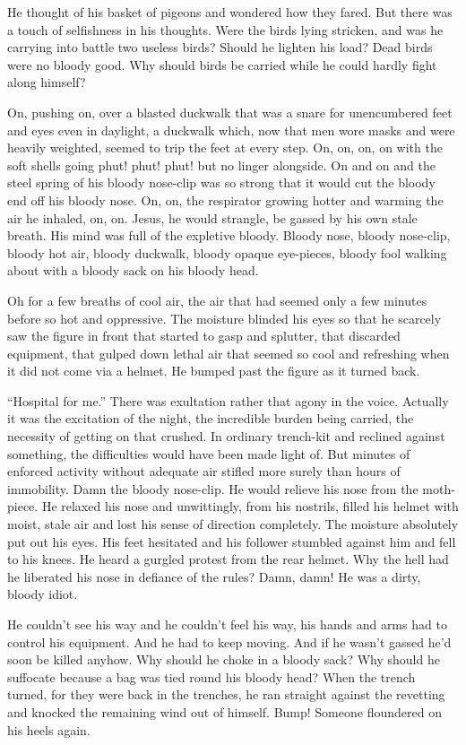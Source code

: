 He thought of his basket of pigeons and wondered how they fared. But there was a touch of selfishness in his thoughts. Were the birds lying stricken, and was he carrying into battle two useless birds? Should he lighten his load? Dead birds were no bloody good. Why should birds be carried while he could hardly fight along himself?

On, pushing on, over a blasted duckwalk that was a snare for unencumbered feet and eyes even in daylight, a duckwalk which, now that men wore masks and were heavily weighted, seemed to trip the feet at every step. On, on, on, on with the soft shells going phut! phut! phut! but no linger alongside. On and on and the steel spring of his bloody nose-clip was so strong that it would cut the bloody end off his bloody nose. On, on, the respirator growing hotter and warming the air he inhaled, on, on. Jesus, he would strangle, be gassed by his own stale breath. His mind was full of the expletive bloody. Bloody nose, bloody nose-clip, bloody hot air, bloody duckwalk, bloody opaque eye-pieces, bloody fool walking about with a bloody sack on his bloody head.

Oh for a few breaths of cool air, the air that had seemed only a few minutes before so hot and oppressive. The moisture blinded his eyes so that he scarcely saw the figure in front that started to gasp and splutter, that discarded equipment, that gulped down lethal air that seemed so cool and refreshing when it did not come via a helmet. He bumped past the figure as it turned back.

``Hospital for me.'' There was exultation rather that agony in the voice. Actually it was the excitation of the night, the incredible burden being carried, the necessity of getting on that crushed. In ordinary trench-kit and reclined against something, the difficulties would have been made light of. But minutes of enforced activity without adequate air stifled more surely than hours of immobility. Damn the bloody nose-clip. He would relieve his nose from the moth-piece. He relaxed his nose and unwittingly, from his nostrils, filled his helmet with moist, stale air and lost his sense of direction completely. The moisture absolutely put out his eyes. His feet hesitated and his follower stumbled against him and fell to his knees. He heard a gurgled protest from the rear helmet. Why the hell had he liberated his nose in defiance of the rules? Damn, damn! He was a dirty, bloody idiot.

He couldn't see his way and he couldn't feel his way, his hands and arms had to control his equipment. And he had to keep moving. And if he wasn't gassed he'd soon be killed anyhow. Why should he choke in a bloody sack? Why should he suffocate because a bag was tied round his bloody head? When the trench turned, for they were back in the trenches, he ran straight against the revetting and knocked the remaining wind out of himself. Bump! Someone floundered on his heels again.

